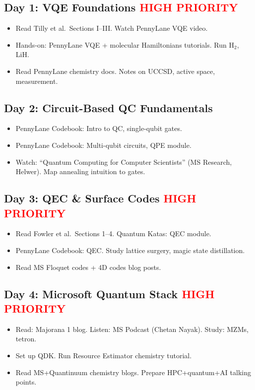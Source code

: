 \documentclass[11pt,a4paper]{article}
\begin{document}
\subsection*{Day 1: VQE Foundations \hfill \textcolor{red}{\textbf{HIGH PRIORITY}}}
\begin{itemize}
    \item[\textbf{AM}] Read Tilly et al.\ Sections I--III. Watch PennyLane VQE video.
    \item[\textbf{PM}] Hands-on: PennyLane VQE + molecular Hamiltonians tutorials. Run H$_2$, LiH.
    \item[\textbf{Eve}] Read PennyLane chemistry docs. Notes on UCCSD, active space, measurement.
\end{itemize}

\subsection*{Day 2: Circuit-Based QC Fundamentals}
\begin{itemize}
    \item[\textbf{AM}] PennyLane Codebook: Intro to QC, single-qubit gates.
    \item[\textbf{PM}] PennyLane Codebook: Multi-qubit circuits, QPE module.
    \item[\textbf{Eve}] Watch: ``Quantum Computing for Computer Scientists'' (MS Research, Helwer). Map annealing intuition to gates.
\end{itemize}

\subsection*{Day 3: QEC \& Surface Codes \hfill \textcolor{red}{\textbf{HIGH PRIORITY}}}
\begin{itemize}
    \item[\textbf{AM}] Read Fowler et al.\ Sections 1--4. Quantum Katas: QEC module.
    \item[\textbf{PM}] PennyLane Codebook: QEC. Study lattice surgery, magic state distillation.
    \item[\textbf{Eve}] Read MS Floquet codes + 4D codes blog posts.
\end{itemize}

\subsection*{Day 4: Microsoft Quantum Stack \hfill \textcolor{red}{\textbf{HIGH PRIORITY}}}
\begin{itemize}
    \item[\textbf{AM}] Read: Majorana 1 blog. Listen: MS Podcast (Chetan Nayak). Study: MZMs, tetron.
    \item[\textbf{PM}] Set up QDK. Run Resource Estimator chemistry tutorial.
    \item[\textbf{Eve}] Read MS+Quantinuum chemistry blogs. Prepare HPC+quantum+AI talking points.
\end{itemize}
\end{document}
